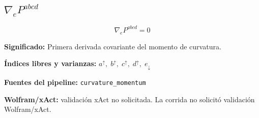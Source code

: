 \documentclass[11pt]{article}
\begin{document}
\subsection*{$ \nabla_e P^{abcd} $}
\begin{dmath*}[breakdepth={5}]
\nabla_e P^{abcd} = 0
\end{dmath*}
\par\vspace{1.2\baselineskip}\noindent
\begin{minipage}{\linewidth}
\textbf{Significado:} Primera derivada covariante del momento de curvatura.\par
\textbf{Índices libres y varianzas:} $ a^{\uparrow},\;b^{\uparrow},\;c^{\uparrow},\;d^{\uparrow},\;e_{\downarrow} $\par
\textbf{Fuentes del pipeline:} \texttt{curvature\_momentum}\par
\textbf{Wolfram/xAct:} validación xAct no solicitada. La corrida no solicitó validación Wolfram/xAct.\par
\end{minipage}
\end{document}
